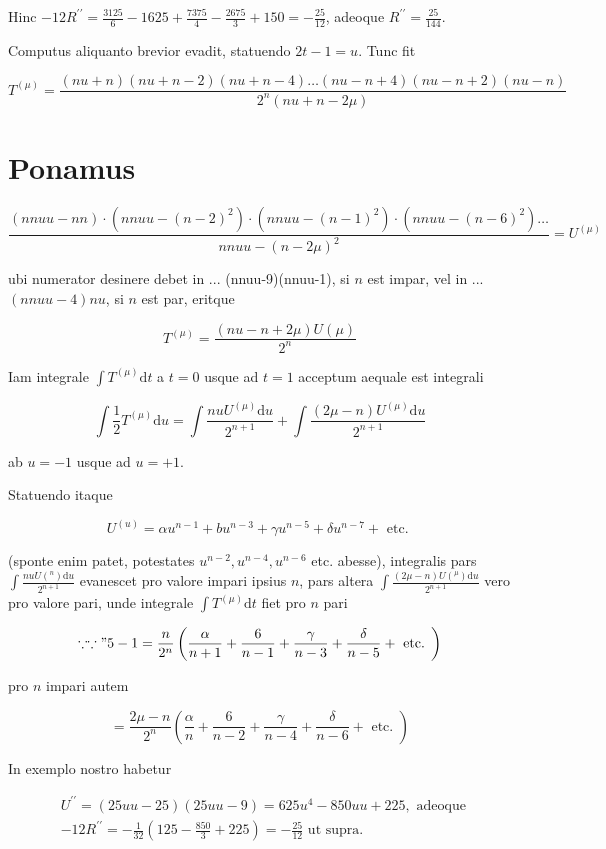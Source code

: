 \documentclass[10pt]{article}
\begin{document}
Hinc \(-12 R^{\prime \prime}=\frac{3125}{6}-1625+\frac{7375}{4}-\frac{2675}{3}+150=-\frac{25}{12}\), adeoque \(R^{\prime \prime}=\frac{25}{144}\).

Computus aliquanto brevior evadit, statuendo \(2 t-1=u\). Tunc fit

\[
T^{(\mu)}=\frac{(n u+n)(n u+n-2)(n u+n-4) \ldots(n u-n+4)(n u-n+2)(n u-n)}{2^{n}(n u+n-2 \mu)}
\]

\section*{Ponamus}
\[
\frac{(n n u u-n n) \cdot\left(n n u u-(n-2)^{2}\right) \cdot\left(n n u u-(n-1)^{2}\right) \cdot\left(n n u u-(n-6)^{2}\right) \ldots}{n n u u-(n-2 \mu)^{2}}=U^{(\mu)}
\]

ubi numerator desinere debet in ... (nnuu-9)(nnuu-1), si \(n\) est impar, vel in ... \((n n u u-4) n u\), si \(n\) est par, eritque

\[
T^{(\mu)}=\frac{(n u-n+2 \mu) U(\mu)}{2^{n}}
\]

Iam integrale \(\int T^{(\mu)} \mathrm{d} t\) a \(t=0\) usque ad \(t=1\) acceptum aequale est integrali

\[
\int \frac{1}{2} T^{(\mu)} \mathrm{d} u=\int \frac{n u U^{(\mu)} \mathrm{d} u}{2^{n+1}}+\int \frac{(2 \mu-n) U^{(\mu)} \mathrm{d} u}{2^{n+1}}
\]

ab \(u=-1\) usque ad \(u=+1\).

Statuendo itaque

\[
U^{(u)}=\alpha u^{n-1}+b u^{n-3}+\gamma u^{n-5}+\delta u^{n-7}+\text { etc. }
\]

(sponte enim patet, potestates \(u^{n-2}, u^{n-4}, u^{n-6}\) etc. abesse), integralis pars \(\int \frac{n u U\left({ }^{n}\right) \mathrm{d} u}{2^{n+1}}\) evanescet pro valore impari ipsius \(n\), pars altera \(\int \frac{(2 \mu-n) U\left({ }^{\mu}\right) \mathrm{d} u}{2^{n+1}}\) vero pro valore pari, unde integrale \(\int T^{(\mu)} \mathrm{d} t\) fiet pro \(n\) pari

\[
\because \because " 5-1=\frac{n}{2^{n}}\left(\frac{\alpha}{n+1}+\frac{6}{n-1}+\frac{\gamma}{n-3}+\frac{\delta}{n-5}+\text { etc. }\right)
\]

pro \(n\) impari autem

\[
=\frac{2 \mu-n}{2^{n}}\left(\frac{\alpha}{n}+\frac{6}{n-2}+\frac{\gamma}{n-4}+\frac{\delta}{n-6}+\text { etc. }\right)
\]

In exemplo nostro habetur

\[
\begin{aligned}
& U^{\prime \prime}=(25 u u-25)(25 u u-9)=625 u^{4}-850 u u+225, \text { adeoque } \\
& -12 R^{\prime \prime}=-\frac{1}{32}\left(125-\frac{850}{3}+225\right)=-\frac{25}{12} \text { ut supra. }
\end{aligned}
\]
\end{document}
